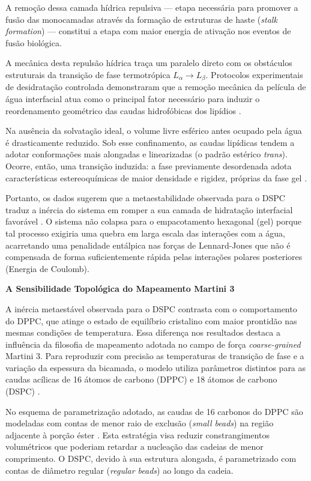 A remoção dessa camada hídrica repulsiva — etapa necessária para promover a fusão das monocamadas através da formação de estruturas de haste (\textit{stalk formation}) — constitui a etapa com maior energia de ativação nos eventos de fusão biológica.

A mecânica desta repulsão hídrica traça um paralelo direto com os obstáculos estruturais da transição de fase termotrópica $L_\alpha \rightarrow L_\beta$. Protocolos experimentais de desidratação controlada demonstraram que a remoção mecânica da película de água interfacial atua como o principal fator necessário para induzir o reordenamento geométrico das caudas hidrofóbicas dos lipídios \cite{krok2024}.

Na ausência da solvatação ideal, o volume livre esférico antes ocupado pela água é drasticamente reduzido. Sob esse confinamento, as caudas lipídicas tendem a adotar conformações mais alongadas e linearizadas (o padrão estérico \textit{trans}). Ocorre, então, uma transição induzida: a fase previamente desordenada adota características estereoquímicas de maior densidade e rigidez, próprias da fase gel \cite{krok2024}.

Portanto, os dados sugerem que a metaestabilidade observada para o DSPC traduz a inércia do sistema em romper a sua camada de hidratação interfacial favorável \cite{katira2015}. O sistema não colapsa para o empacotamento hexagonal (gel) porque tal processo exigiria uma quebra em larga escala das interações com a água, acarretando uma penalidade entálpica nas forças de Lennard-Jones que não é compensada de forma suficientemente rápida pelas interações polares posteriores (Energia de Coulomb).


\vspace{1em}
\noindent\textbf{A Sensibilidade Topológica do Mapeamento Martini 3}

A inércia metaestável observada para o DSPC contrasta com o comportamento do DPPC, que atinge o estado de equilíbrio cristalino com maior prontidão nas mesmas condições de temperatura. Essa diferença nos resultados destaca a influência da filosofia de mapeamento adotada no campo de força \textit{coarse-grained} Martini 3. Para reproduzir com precisão as temperaturas de transição de fase e a variação da espessura da bicamada, o modelo utiliza parâmetros distintos para as caudas acílicas de 16 átomos de carbono (DPPC) e 18 átomos de carbono (DSPC) \cite{marrink2022, ramirez2025}.

No esquema de parametrização adotado, as caudas de 16 carbonos do DPPC são modeladas com contas de menor raio de exclusão (\textit{small beads}) na região adjacente à porção éster \cite{marrink2022}. Esta estratégia visa reduzir constrangimentos volumétricos que poderiam retardar a nucleação das cadeias de menor comprimento. O DSPC, devido à sua estrutura alongada, é parametrizado com contas de diâmetro regular (\textit{regular beads}) ao longo da cadeia.

